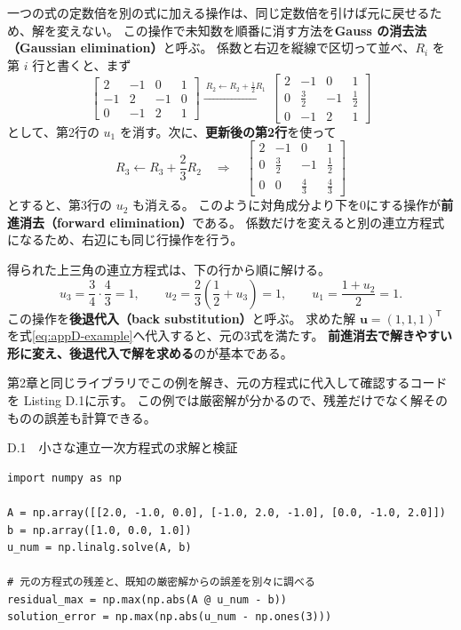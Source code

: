 一つの式の定数倍を別の式に加える操作は、同じ定数倍を引けば元に戻せるため、解を変えない。
この操作で未知数を順番に消す方法を\textbf{Gauss の消去法（Gaussian elimination）}と呼ぶ。
係数と右辺を縦線で区切って並べ、$R_i$ を第 $i$ 行と書くと、まず
\begin{equation}
 \left[\begin{array}{ccc|c}2&-1&0&1\\-1&2&-1&0\\0&-1&2&1\end{array}\right]
 \xrightarrow{\ R_2\leftarrow R_2+\frac12R_1\ }
 \left[\begin{array}{ccc|c}2&-1&0&1\\0&\frac32&-1&\frac12\\0&-1&2&1\end{array}\right]
\label{eq:appD-first-elimination}
\end{equation}
として、第2行の $u_1$ を消す。次に、\textbf{更新後の第2行}を使って
\begin{equation}
 R_3\leftarrow R_3+\frac23R_2
 \quad\Longrightarrow\quad
 \left[\begin{array}{ccc|c}2&-1&0&1\\0&\frac32&-1&\frac12\\0&0&\frac43&\frac43\end{array}\right]
\label{eq:appD-second-elimination}
\end{equation}
とすると、第3行の $u_2$ も消える。
このように対角成分より下を0にする操作が\textbf{前進消去（forward elimination）}である。
係数だけを変えると別の連立方程式になるため、右辺にも同じ行操作を行う。

得られた上三角の連立方程式は、下の行から順に解ける。
\begin{equation}
 u_3=\frac34\cdot\frac43=1,\qquad
 u_2=\frac23\left(\frac12+u_3\right)=1,\qquad
 u_1=\frac{1+u_2}{2}=1.
\label{eq:appD-back-substitution}
\end{equation}
この操作を\textbf{後退代入（back substitution）}と呼ぶ。
求めた解 $\boldsymbol u=(1,1,1)^{\mathsf T}$ を式\eqref{eq:appD-example}へ代入すると、元の3式を満たす。
\textbf{前進消去で解きやすい形に変え、後退代入で解を求める}のが基本である。

第2章と同じライブラリでこの例を解き、元の方程式に代入して確認するコードを Listing D.1に示す。
この例では厳密解が分かるので、残差だけでなく解そのものの誤差も計算できる。

\begin{listingbox}[left=6mm]{D.1　小さな連立一次方程式の求解と検証}
\begin{Verbatim}[fontsize=\small]
import numpy as np

A = np.array([[2.0, -1.0, 0.0], [-1.0, 2.0, -1.0], [0.0, -1.0, 2.0]])
b = np.array([1.0, 0.0, 1.0])
u_num = np.linalg.solve(A, b)

# 元の方程式の残差と、既知の厳密解からの誤差を別々に調べる
residual_max = np.max(np.abs(A @ u_num - b))
solution_error = np.max(np.abs(u_num - np.ones(3)))
\end{Verbatim}
\end{listingbox}

